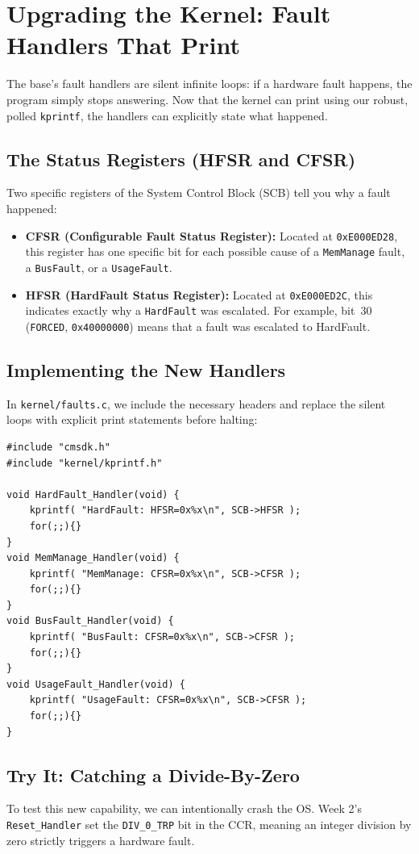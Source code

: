 \section{Upgrading the Kernel: Fault Handlers That Print}
The base's fault handlers are silent infinite loops: if a hardware fault happens, the program simply stops answering. Now that the kernel can print using our robust, polled \texttt{kprintf}, the handlers can explicitly state what happened.

\subsection{The Status Registers (HFSR and CFSR)}
Two specific registers of the System Control Block (SCB) tell you why a fault happened:
\begin{itemize}
    \item \textbf{CFSR (Configurable Fault Status Register):} Located at \texttt{0xE000ED28}, this register has one specific bit for each possible cause of a \texttt{MemManage} fault, a \texttt{BusFault}, or a \texttt{UsageFault}.
    \item \textbf{HFSR (HardFault Status Register):} Located at \texttt{0xE000ED2C}, this indicates exactly why a \texttt{HardFault} was escalated. For example, bit~30 (\texttt{FORCED}, \texttt{0x40000000}) means that a fault was
escalated to HardFault.
\end{itemize}



\subsection{Implementing the New Handlers}
In \texttt{kernel/faults.c}, we include the necessary headers and replace the silent loops with explicit print statements before halting:
\begin{lstlisting}
#include "cmsdk.h"
#include "kernel/kprintf.h"

void HardFault_Handler(void) {
    kprintf( "HardFault: HFSR=0x%x\n", SCB->HFSR );
    for(;;){}
}
void MemManage_Handler(void) {
    kprintf( "MemManage: CFSR=0x%x\n", SCB->CFSR );
    for(;;){}
}
void BusFault_Handler(void) {
    kprintf( "BusFault: CFSR=0x%x\n", SCB->CFSR );
    for(;;){}
}
void UsageFault_Handler(void) {
    kprintf( "UsageFault: CFSR=0x%x\n", SCB->CFSR );
    for(;;){}
}
\end{lstlisting}

\subsection{Try It: Catching a Divide-By-Zero}
To test this new capability, we can intentionally crash the OS. Week 2's \texttt{Reset\_Handler} set the \texttt{DIV\_0\_TRP} bit in the CCR, meaning an integer division by zero strictly triggers a hardware fault. 

